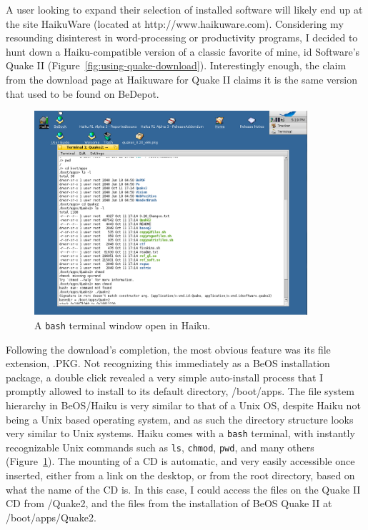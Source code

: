 \documentclass{article}
\newcommand{\figref}[1]{Figure~\ref{fig:#1}}
\begin{document}
A user looking to expand their selection of installed software will
likely end up at the site HaikuWare (located at
http://www.haikuware.com).  Considering my resounding disinterest in
word-processing or productivity programs, I decided to hunt down a
Haiku-compatible version of a classic favorite of mine, id Software's
Quake II (\figref{using-quake-download}).  Interestingly enough, the
claim from the download page at Haikuware for Quake II claims it is
the same version that used to be found on BeDepot.
	
\begin{figure}[h]
\centering
\includegraphics[width=0.9\textwidth]{figs/using-terminal.png}
\caption{A \texttt{bash} terminal window open in Haiku.}
\label{fig:using-terminal}
\end{figure}

Following the download's completion, the most obvious feature was its
file extension, .PKG. Not recognizing this immediately as a BeOS
installation package, a double click revealed a very simple
auto-install process that I promptly allowed to install to its default
directory, /boot/apps.  The file system hierarchy in BeOS/Haiku is
very similar to that of a Unix OS, despite Haiku not being a Unix
based operating system, and as such the directory structure looks very
similar to Unix systems.  Haiku comes with a \texttt{bash} terminal,
with instantly recognizable Unix commands such
as \texttt{ls}, \texttt{chmod}, \texttt{pwd}, and many others
(\figref{using-terminal}).  The mounting of a CD is automatic, and
very easily accessible once inserted, either from a link on the
desktop, or from the root directory, based on what the name of the CD
is.  In this case, I could access the files on the Quake II CD from
/Quake2, and the files from the installation of BeOS Quake II at
/boot/apps/Quake2.
\end{document}
